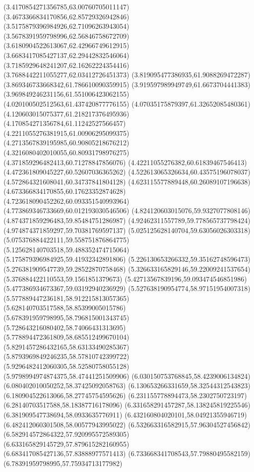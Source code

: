 {(3.4170854271356785,63.00760705011147)
(3.4673366834170856,62.85729326942846)
(3.5175879396984926,62.71096263943054)
(3.5678391959798996,62.56846758672709)
(3.6180904522613067,62.42966749612915)
(3.6683417085427137,62.29442832546064)
(3.7185929648241207,62.16262224354416)
(3.7688442211055277,62.03412726451373)
(3.819095477386935,61.9088269472287)
(3.869346733668342,61.786610090359915)
(3.919597989949749,61.6673704441383)
(3.969849246231156,61.551006423062155)
(4.020100502512563,61.437420877776155)
(4.07035175879397,61.32652085480361)
(4.120603015075377,61.218217376495936)
(4.170854271356784,61.11242527566457)
(4.2211055276381915,61.00906295099375)
(4.2713567839195985,60.90805218676212)
(4.3216080402010055,60.80931798976275)
(4.371859296482413,60.71278847856076)
(4.42211055276382,60.61839467546413)
(4.472361809045227,60.52607036365262)
(4.522613065326634,60.43575196078037)
(4.572864321608041,60.34737841804128)
(4.623115577889448,60.26089107196638)
(4.673366834170855,60.17623352874628)
(4.723618090452262,60.093351540993964)
(4.773869346733669,60.012193030546506)
(4.824120603015076,59.9327077808146)
(4.874371859296483,59.85484751286987)
(4.92462311557789,59.778565737798424)
(4.974874371859297,59.70381769597137)
(5.025125628140704,59.63056026303318)
(5.075376884422111,59.558751876864775)
(5.125628140703518,59.488352474715064)
(5.175879396984925,59.41932342891806)
(5.226130653266332,59.35162748596473)
(5.276381909547739,59.28522870758468)
(5.326633165829146,59.22009241537654)
(5.376884422110553,59.1561851379673)
(5.42713567839196,59.093474546851986)
(5.477386934673367,59.03192940236929)
(5.527638190954774,58.97151954007318)
(5.577889447236181,58.912215813057365)
(5.628140703517588,58.85399005015786)
(5.678391959798995,58.796815001343745)
(5.728643216080402,58.74066431313695)
(5.778894472361809,58.685512499670104)
(5.8291457286432165,58.63133490285367)
(5.8793969849246235,58.57810742399722)
(5.9296482412060305,58.52580758055128)
(5.9798994974874375,58.47441251509906)
(6.030150753768845,58.4239006134824)
(6.080402010050252,58.37425092058763)
(6.130653266331659,58.32544312543823)
(6.180904522613066,58.27745754595626)
(6.231155778894473,58.2302750723197)
(6.28140703517588,58.18387716178096)
(6.331658291457287,58.138245819225546)
(6.381909547738694,58.0933635776911)
(6.432160804020101,58.04921355946719)
(6.482412060301508,58.00577943995022)
(6.532663316582915,57.96304527456842)
(6.582914572864322,57.920995572589305)
(6.633165829145729,57.879615282160955)
(6.683417085427136,57.83888977571413)
(6.733668341708543,57.79880495582159)
(6.78391959798995,57.75934713177982)
}
